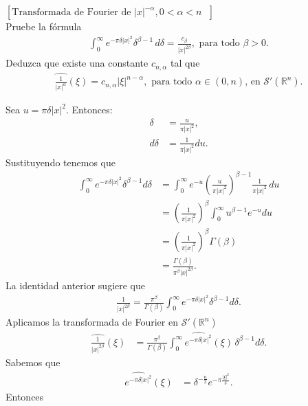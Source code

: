 \begin{homeworkProblem}
  $[\text{Transformada de Fourier de $|x|^{-\alpha},0<\alpha< n$ }]$\\
  Pruebe la fórmula
  \begin{align*}
    \int_{0}^{\infty}e^{-\pi\delta|x|^2}\delta^{\beta-1}\, d\delta=\frac{c_{\beta}}{|x|^{2\beta}},\text{ para todo $\beta>0$.}
  \end{align*}
  Deduzca que existe una constante $c_{n,\alpha}$ tal que
  \begin{align*}
    \hat{\frac{1}{|x|^{\alpha}}}(\xi)=c_{n,\alpha}|\xi|^{n-\alpha},\text{ para todo $\alpha\in(0,n)$, en $\mathcal{S}'(\mathbb{R}^{n})$.}
  \end{align*}
  \begin{solution}
    Sea $u = \pi \delta |x|^2$. Entonces:
    \begin{align*}
      \delta &= \frac{u}{\pi |x|^2}, \\
      d\delta &= \frac{1}{\pi |x|^2} du.
    \end{align*}
    Sustituyendo tenemos que
    \begin{align*}
      \int_0^\infty e^{-\pi \delta |x|^2} \delta^{\beta - 1} d\delta
      &= \int_0^\infty e^{-u} \left(\frac{u}{\pi |x|^2}\right)^{\beta - 1} \frac{1}{\pi |x|^2} \, du \\
      &= \left(\frac{1}{\pi |x|^2}\right)^\beta \int_0^\infty u^{\beta - 1} e^{-u} du \\
      &= \left(\frac{1}{\pi |x|^2}\right)^\beta \Gamma(\beta) \\
      &= \frac{\Gamma(\beta)}{\pi^\beta |x|^{2\beta}}.
    \end{align*}
    La identidad anterior sugiere que
    \begin{align*}
      \frac{1}{|x|^{2\beta}} = \frac{\pi^\beta}{\Gamma(\beta)} \int_0^\infty e^{-\pi \delta |x|^2} \delta^{\beta - 1} d\delta.      
    \end{align*}
    Aplicamos la transformada de Fourier en $\mathcal{S}'(\mathbb{R}^n)$
    \begin{align*}
      \hat{ \frac{1}{|x|^{2\beta}} }(\xi)
      &= \frac{\pi^\beta}{\Gamma(\beta)} \int_0^\infty \hat{ e^{-\pi \delta |x|^2} }(\xi) \, \delta^{\beta - 1} d\delta.
    \end{align*}
    Sabemos que
    \begin{align*}
      \hat{e^{-\pi \delta |x|^2}}(\xi) &= \delta^{-\frac{n}{2}} e^{-\pi \frac{|\xi|^2}{\delta}}.
    \end{align*}
    Entonces

\end{solution}
\end{homeworkProblem}
